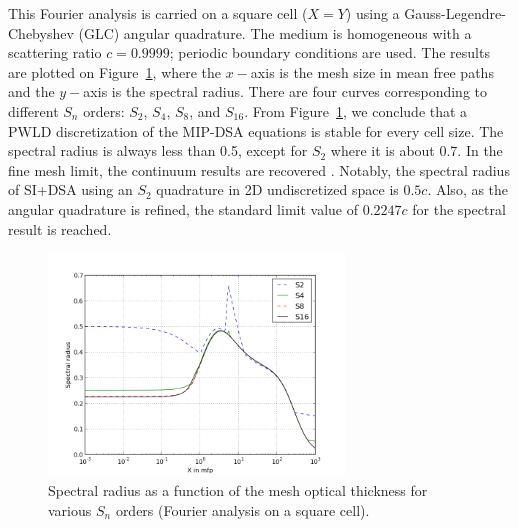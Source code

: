 \documentclass[preprint,10pt]{elsarticle}
\renewcommand{\(}{\left(}
\renewcommand{\)}{\right)}
\renewcommand{\[}{\left[}
\renewcommand{\]}{\right]}
\newcommand{\sn}{\ensuremath{S_n}\xspace}
\begin{document}
This Fourier analysis is carried on a square cell ($X=Y$) using a
Gauss-Legendre-Chebyshev (GLC) angular quadrature. The medium is homogeneous with a 
scattering ratio $c=0.9999$; periodic boundary conditions are used. The results 
are plotted on Figure~\ref {fig_fa_sn}, where the $x-$axis is the mesh size in mean free 
paths and the $y-$axis is the spectral radius. There are four curves corresponding 
to different $S_n$ orders: $S_2$, $S_4$, $S_8$, and $S_{16}$.
From Figure~\ref {fig_fa_sn}, we conclude that a PWLD discretization of the MIP-DSA equations 
is stable for every cell size. The spectral radius is always less than 0.5, except for $S_2$ where 
it is about 0.7. In the fine mesh limit, the continuum results are recovered \cite{multisweep}. Notably,
the spectral radius of SI+DSA using an $S_2$ quadrature in 2D undiscretized space is $0.5c$. Also, as the angular 
quadrature is refined, the standard limit value of $0.2247c$ for the spectral result is reached.
\begin{figure}[!htbp]
  \centering
  \includegraphics[width=0.7\textwidth]{sn_order_9999}
  \caption{Spectral radius as a function of the mesh optical thickness for various \sn orders (Fourier analysis on a square cell).}
  \label{fig_fa_sn}
\end{figure}
\end{document}
